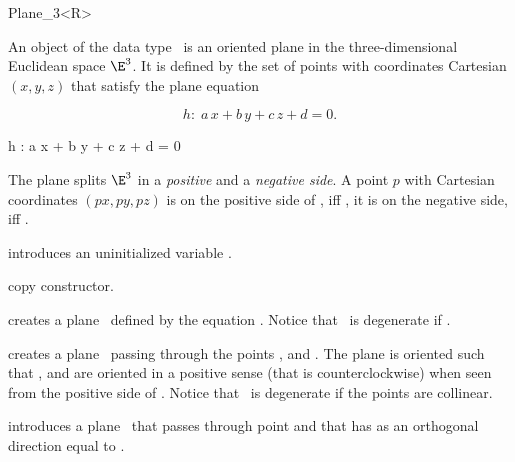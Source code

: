 \begin{ccRefClass} {Plane_3<R>}

\ccDefinition
An object  of the data type \ccRefName\ is an oriented
plane in the three-dimensional Euclidean space $\E^3$. It is defined
by the set of points with coordinates Cartesian $(x,y,z)$ that satisfy 
the plane equation 

\begin{ccTexOnly}
\[h :\;  a\, x +b\, y +c\, z + d = 0.\]
\end{ccTexOnly}
\begin{ccHtmlOnly}
h : a x + b y + c z + d = 0
\end{ccHtmlOnly}

The plane splits $\E^3$ in a {\em positive} and a {\em negative
side}. 
A point $p$ with Cartesian coordinates $(px, py, pz)$ is on the positive side of
, iff , it is on the
negative side, iff .



\ccCreation
{}


\ccHidden {}
             {introduces an uninitialized variable \ccVar.}

\ccHidden {}
            {copy constructor.}

{creates a plane \ccVar\ defined by the equation
 .
Notice that \ccVar\ is degenerate if .}

{creates a plane \ccVar\ passing through the points ,
  and . The plane is oriented such that , 
  and  are oriented in a positive sense 
 (that is counterclockwise) when seen from the positive side of \ccVar.
Notice that \ccVar\ is degenerate if the points are collinear.}


{introduces a plane \ccVar\ that passes through point  and
 that has as an orthogonal direction equal to .}


\end{ccRefClass}
